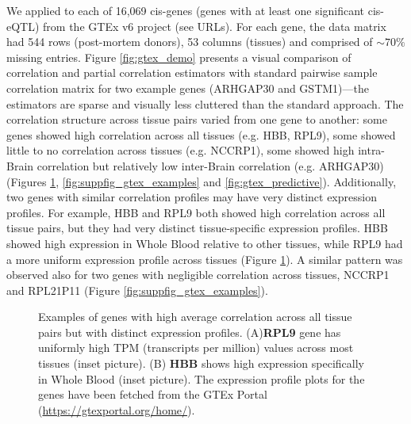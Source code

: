We applied \Robocov{} to each of 16,069 cis-genes (genes with at least one significant cis-eQTL) from the GTEx v6 project \cite{dey2017} (see URLs). For each gene, the data matrix had 544 rows (post-mortem donors), 53 columns (tissues) and comprised of $\sim70\%$ missing entries.  Figure \ref{fig:gtex_demo} presents a visual comparison of \Robocov{} correlation and partial correlation estimators with standard pairwise sample correlation matrix for two example genes (ARHGAP30 and GSTM1)---the \Robocov{} estimators are sparse and visually less cluttered than the standard approach. The \Robocov{} correlation structure across tissue pairs varied from one gene to another: some genes showed high correlation across all tissues (e.g. HBB, RPL9), some showed little to no correlation across tissues (e.g. NCCRP1), some showed high intra-Brain correlation but relatively low inter-Brain correlation (e.g. ARHGAP30) (Figures \ref{fig:gtex_examples_main},  \ref{fig:suppfig_gtex_examples} and  \ref{fig:gtex_predictive}). Additionally, two genes with similar correlation profiles may have very distinct expression profiles. For example,  HBB and RPL9 both showed high correlation across all tissue pairs, but they had very  distinct tissue-specific expression profiles. HBB showed high expression in Whole Blood relative to other tissues, while RPL9 had a more uniform expression profile across tissues (Figure \ref{fig:gtex_examples_main}). A similar pattern was observed also for two genes with negligible correlation across tissues, NCCRP1 and RPL21P11 (Figure \ref{fig:suppfig_gtex_examples}). 



\begin{figure}[!tpb]
\centering
{}
\caption{\small {{Examples of genes with high average \Robocov{} correlation across all tissue pairs but with distinct expression profiles. (A)\textbf{RPL9} gene has uniformly high TPM (transcripts per million) values across most tissues (inset picture). (B) \textbf{HBB} shows high expression specifically in Whole Blood (inset picture). The expression profile plots for the genes have been fetched from the GTEx Portal (\url{https://gtexportal.org/home/}).}}}
\label{fig:gtex_examples_main}
\end{figure}





